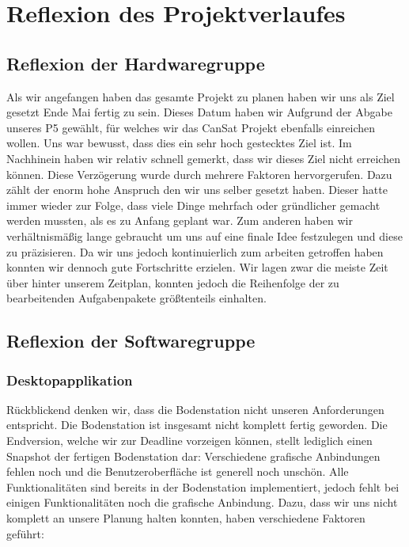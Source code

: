 \section{Reflexion des Projektverlaufes}
\subsection{Reflexion der Hardwaregruppe}
Als wir angefangen haben das gesamte Projekt zu planen haben wir uns als Ziel gesetzt Ende Mai fertig zu sein. Dieses Datum haben wir Aufgrund der Abgabe unseres P5 gewählt, für welches wir das CanSat Projekt ebenfalls einreichen wollen. Uns war bewusst, dass dies ein sehr hoch gestecktes Ziel ist. Im Nachhinein haben wir relativ schnell gemerkt, dass wir dieses Ziel nicht erreichen können. Diese Verzögerung wurde durch mehrere Faktoren hervorgerufen. Dazu zählt der enorm hohe Anspruch den wir uns selber gesetzt haben. Dieser hatte immer wieder zur Folge, dass viele Dinge mehrfach oder gründlicher gemacht werden mussten, als es zu Anfang geplant war. Zum anderen haben wir verhältnismäßig lange gebraucht um uns auf eine finale Idee festzulegen und diese zu präzisieren. Da wir uns jedoch kontinuierlich zum arbeiten getroffen haben konnten wir dennoch gute Fortschritte erzielen. Wir lagen zwar die meiste Zeit über hinter unserem Zeitplan, konnten jedoch die Reihenfolge der zu bearbeitenden Aufgabenpakete größtenteils einhalten.

\subsection{Reflexion der Softwaregruppe}
\subsubsection{Desktopapplikation}
Rückblickend denken wir, dass die Bodenstation nicht unseren Anforderungen entspricht. Die Bodenstation ist insgesamt nicht komplett fertig geworden. Die Endversion, welche wir zur Deadline vorzeigen können, stellt lediglich einen Snapshot der fertigen Bodenstation dar: Verschiedene grafische Anbindungen fehlen noch und die Benutzeroberfläche ist generell noch unschön. Alle Funktionalitäten sind bereits in der Bodenstation implementiert, jedoch fehlt bei einigen Funktionalitäten noch die grafische Anbindung. Dazu, dass wir uns nicht komplett an unsere Planung halten konnten, haben verschiedene Faktoren geführt:

